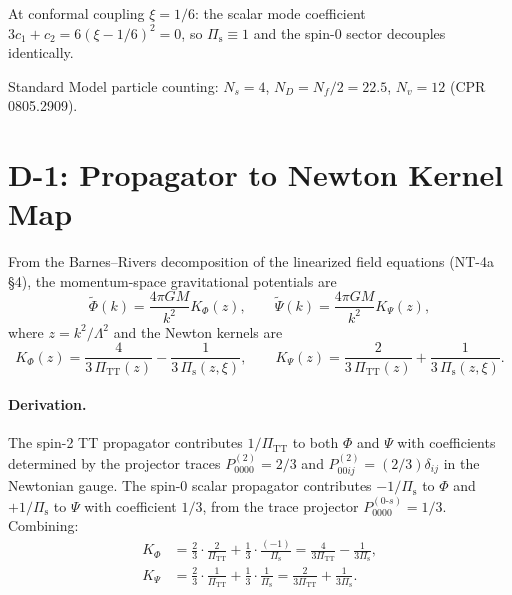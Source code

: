 \documentclass[11pt,a4paper]{article}
\newcommand{\PiTT}{\Pi_{\mathrm{TT}}}
\newcommand{\Pis}{\Pi_{\mathrm{s}}}
\newcommand{\KPhi}{K_\Phi}
\newcommand{\KPsi}{K_\Psi}
\begin{document}
At conformal coupling $\xi = 1/6$: the scalar mode coefficient
$3c_1 + c_2 = 6(\xi - 1/6)^2 = 0$, so $\Pis \equiv 1$ and the spin-0
sector decouples identically.

Standard Model particle counting: $N_s = 4$, $N_D = N_f/2 = 22.5$,
$N_v = 12$ (CPR 0805.2909).


\section{D-1: Propagator to Newton Kernel Map}
\label{sec:kernels}

From the Barnes--Rivers decomposition of the linearized field equations
(NT-4a \S4), the momentum-space gravitational potentials are
\begin{equation}\label{eq:potentials_k}
  \tilde{\Phi}(k) = \frac{4\pi GM}{k^2} \KPhi(z), \qquad
  \tilde{\Psi}(k) = \frac{4\pi GM}{k^2} \KPsi(z),
\end{equation}
where $z = k^2/\Lambda^2$ and the Newton kernels are
\begin{equation}\label{eq:kernels}
  \boxed{
    \KPhi(z) = \frac{4}{3\,\PiTT(z)} - \frac{1}{3\,\Pis(z,\xi)}, \qquad
    \KPsi(z) = \frac{2}{3\,\PiTT(z)} + \frac{1}{3\,\Pis(z,\xi)}.
  }
\end{equation}

\paragraph{Derivation.}
The spin-2 TT propagator contributes $1/\PiTT$ to both $\Phi$ and $\Psi$
with coefficients determined by the projector traces
$P^{(2)}_{0000} = 2/3$ and $P^{(2)}_{00ij} = (2/3)\delta_{ij}$ in the
Newtonian gauge.  The spin-0 scalar propagator contributes $-1/\Pis$ to
$\Phi$ and $+1/\Pis$ to $\Psi$ with coefficient $1/3$, from the trace
projector $P^{(0\text{-}s)}_{0000} = 1/3$.  Combining:
\begin{align}
  \KPhi &= \frac{2}{3} \cdot \frac{2}{\PiTT} + \frac{1}{3} \cdot \frac{(-1)}{\Pis}
         = \frac{4}{3\PiTT} - \frac{1}{3\Pis}, \\
  \KPsi &= \frac{2}{3} \cdot \frac{1}{\PiTT} + \frac{1}{3} \cdot \frac{1}{\Pis}
         = \frac{2}{3\PiTT} + \frac{1}{3\Pis}.
\end{align}
\end{document}
